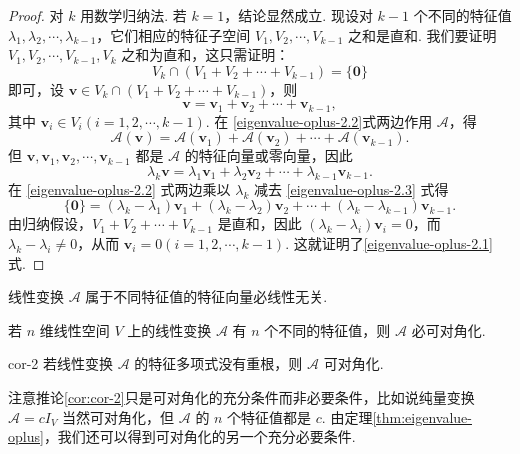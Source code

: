 \documentclass[12pt, a4paper]{ctexart}
\begin{document}
\begin{proof}
	对 $ k $ 用数学归纳法. 若 $ k = 1 $，结论显然成立. 现设对 $ k-1 $ 个不同的特征值 $ \lambda_1, \lambda_2, \cdots, \lambda_{k-1} $，它们相应的特征子空间 $ V_1, V_2, \cdots, V_{k-1} $ 之和是直和. 我们要证明 $ V_1, V_2, \cdots, V_{k-1}, V_k $ 之和为直和，这只需证明：
	\begin{equation}\label{eigenvalue-oplus-2.1} 
		V_k \cap (V_1 + V_2 + \cdots + V_{k-1}) = \{\mathbf 0\}
	\end{equation}
	即可，设 $ \bm{v} \in V_k \cap (V_1 + V_2 + \cdots + V_{k-1}) $，则\begin{equation}\label{eigenvalue-oplus-2.2}
		\bm{v} = \bm{v}_1 + \bm{v}_2 + \cdots + \bm{v}_{k-1},
	\end{equation}
	其中 $ \bm{v}_i \in V_i (i = 1, 2, \cdots, k-1) $. 在 \eqref{eigenvalue-oplus-2.2}式两边作用 $ \mathcal{A} $，得
	\[
	\mathcal{A}(\bm{v}) = \mathcal{A}(\bm{v}_1) + \mathcal{A}(\bm{v}_2) + \cdots + \mathcal{A}(\bm{v}_{k-1}).
	\]
	但 $ \bm{v}, \bm{v}_1, \bm{v}_2, \cdots, \bm{v}_{k-1} $ 都是 $ \mathcal{A} $ 的特征向量或零向量，因此
	\begin{equation}\label{eigenvalue-oplus-2.3}
		\lambda_k \bm{v} = \lambda_1 \bm{v}_1 + \lambda_2 \bm{v}_2 + \cdots + \lambda_{k-1} \bm{v}_{k-1}.
	\end{equation}
	在 \eqref{eigenvalue-oplus-2.2} 式两边乘以 $ \lambda_k $ 减去 \eqref{eigenvalue-oplus-2.3}  式得
	\[
	\{\mathbf 0\} = (\lambda_k - \lambda_1) \bm{v}_1 + (\lambda_k - \lambda_2) \bm{v}_2 + \cdots + (\lambda_k - \lambda_{k-1}) \bm{v}_{k-1}.
	\]
	由归纳假设，$ V_1 + V_2 + \cdots + V_{k-1} $ 是直和，因此 $ (\lambda_k - \lambda_i) \bm{v}_i = 0 $，而 $ \lambda_k - \lambda_i \neq 0 $，从而 $ \bm{v}_i = 0 (i = 1, 2, \cdots, k-1) $. 这就证明了\eqref{eigenvalue-oplus-2.1} 式. 
\end{proof}
\begin{corollary}{}{}
	线性变换 $ \mathcal{A} $ 属于不同特征值的特征向量必线性无关. 
\end{corollary}
\begin{corollary}{}{}
	若 $ n $ 维线性空间 $ V $ 上的线性变换 $ \mathcal{A} $ 有 $ n $ 个不同的特征值，则 $ \mathcal{A} $ 必可对角化. 
\end{corollary}
\begin{corollary}{}{cor-2}
	若线性变换 $ \mathcal{A} $ 的特征多项式没有重根，则 $ \mathcal{A} $ 可对角化. 
\end{corollary}
注意推论\ref{cor:cor-2}只是可对角化的充分条件而非必要条件，比如说纯量变换 $ \mathcal{A} = cI_V $ 当然可对角化，但 $ \mathcal{A} $ 的 $ n $ 个特征值都是 $ c $. 由定理\ref{thm:eigenvalue-oplus}，我们还可以得到可对角化的另一个充分必要条件. 
\end{document}
